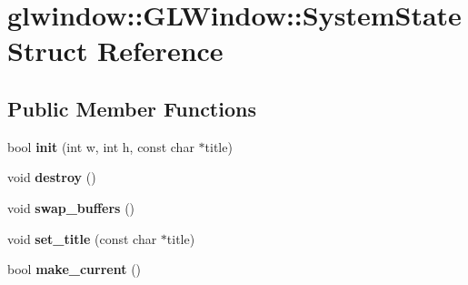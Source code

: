 \hypertarget{struct_g_l_window_1_1_system_state}{}\section{glwindow\+:\+:G\+L\+Window\+:\+:System\+State Struct Reference}
\label{struct_g_l_window_1_1_system_state}
\subsection*{Public Member Functions}
\begin{DoxyCompactItemize}
\item 
\mbox{\label{struct_g_l_window_1_1_system_state_a5c10afc9873e8429448fc085230099a4}} 
bool {\bfseries init} (int w, int h, const char $\ast$title)
\item 
\mbox{\label{struct_g_l_window_1_1_system_state_a0eccf6dc59ec9e8b062eb8cd56398e60}} 
void {\bfseries destroy} ()
\item 
\mbox{\label{struct_g_l_window_1_1_system_state_aecbb2620bcb643e4bad1280b5ae5c9f5}} 
void {\bfseries swap\+\_\+buffers} ()
\item 
\mbox{\label{struct_g_l_window_1_1_system_state_a760021e568f2dc7e0cc5a68fb835321e}} 
void {\bfseries set\+\_\+title} (const char $\ast$title)
\item 
\mbox{\label{struct_g_l_window_1_1_system_state_ad553d495b4f03b0cb666cb9916ba1180}} 
bool {\bfseries make\+\_\+current} ()
\end{DoxyCompactItemize}
